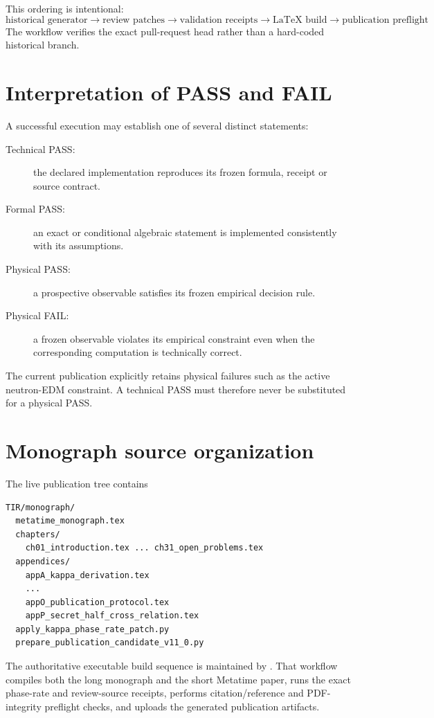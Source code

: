 This ordering is intentional:
\[
\boxed{
\text{historical generator}
\to
\text{review patches}
\to
\text{validation receipts}
\to
\text{LaTeX build}
\to
\text{publication preflight}
}.
\]
The workflow verifies the exact pull-request head rather than a hard-coded
historical branch.

\section{Interpretation of PASS and FAIL}

A successful execution may establish one of several distinct statements:
\begin{description}
\item[Technical PASS:] the declared implementation reproduces its frozen formula,
receipt or source contract.
\item[Formal PASS:] an exact or conditional algebraic statement is implemented
consistently with its assumptions.
\item[Physical PASS:] a prospective observable satisfies its frozen empirical
decision rule.
\item[Physical FAIL:] a frozen observable violates its empirical constraint even
when the corresponding computation is technically correct.
\end{description}

The current publication explicitly retains physical failures such as the active
neutron-EDM constraint.  A technical PASS must therefore never be substituted for
a physical PASS.

\section{Monograph source organization}

The live publication tree contains
\begin{verbatim}
TIR/monograph/
  metatime_monograph.tex
  chapters/
    ch01_introduction.tex ... ch31_open_problems.tex
  appendices/
    appA_kappa_derivation.tex
    ...
    appO_publication_protocol.tex
    appP_secret_half_cross_relation.tex
  apply_kappa_phase_rate_patch.py
  prepare_publication_candidate_v11_0.py
\end{verbatim}

The authoritative executable build sequence is maintained by
.  That workflow compiles
both the long monograph and the short Metatime paper, runs the exact phase-rate
and review-source receipts, performs citation/reference and PDF-integrity
preflight checks, and uploads the generated publication artifacts.
